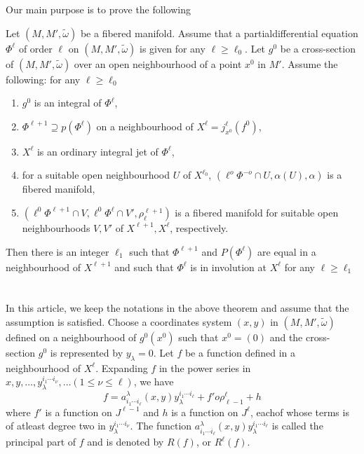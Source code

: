 Our main purpose is to prove the following

\begin{theorem}\label{chap3:sec3.16:thm6}%
  Let $(M,M', \tilde{\omega})$ be a fibered manifold. Assume that a
  partial\pageoriginale differential equation $\Phi^\ell$ of order $\ell$ on
  $(M,M',\tilde{\omega})$ is given for any $\ell \geq \ell_0$. Let
  $g^0$ be a cross-section of $(M,M',\tilde{\omega})$ over an open
  neighbourhood of a point $x^0$ in $M'$. Assume the following: for
  any $\ell \geq \ell_0$  
  \begin{enumerate}[\rm (i)]
  \item $g^0$ is an integral of $\Phi^\ell$,
  \item $\Phi^{\ell+1} \supseteq p (\Phi^\ell)$ on a neighbourhood of
    $X^\ell = j^{\ell}_{x^0} (f^0)$, 
  \item $X^\ell$ is an ordinary integral jet of $\Phi^\ell$,
  \item for a suitable open neighbourhood $U$ of $X^{\ell_0}$,
    $(\ell^o \Phi^{-o} \cap U, \alpha (U),\alpha)$ is a fibered manifold,
  \item $(\ell^0 \Phi ^{\ell+1} \cap V, \ell^0 \Phi ^\ell \cap V',
    \rho^{\ell+1}_{\ell})$ is a fibered manifold for suitable open
    neighbourhoods $V,V'$ of $X^{\ell+1},X^\ell$, respectively.  
  \end{enumerate}
\end{theorem}

Then there is an integer $\ell_1$ such that $\Phi^{\ell+1}$ and
$P(\Phi^\ell)$ are equal in a neighbourhood of $X^{\ell+1}$ and such
that $\Phi^\ell$ is in involution at $X^\ell$ for any $\ell\geq
\ell_1$  
 
\section{}\label{chap3:sec3.17}%

In this article, we keep the notations in the above theorem and assume
that the assumption is satisfied. Choose a coordinates system $(x,y)$
in $(M,M',\tilde{\omega})$ defined on a neighbourhood of $g^0(x^0)$
such that $x^0=(0)$ and the cross-section $g^0$ is represented by
$y_\lambda =0$. Let $f$ be a function defined in a neighbourhood of
$X^\ell$. Expanding $f$ in the power series in $x,y,\ldots ,y_\lambda
^{i_1\cdots i_\nu},\ldots (1 \leq \nu \leq \ell)$, we have  
$$
f = a^\lambda_{i_1\cdots i_\ell} (x,y)y_\lambda^{i_1\cdots i_\ell} +
f' o \rho^\ell_{\ell-1} + h 
$$
where $f'$ is a function on $J^{\ell-1}$ and $h$ is a function on
$J^\ell$, each\pageoriginale of whose terms is of atleast degree two in
$y^{i_1\cdots i_\nu}_{\lambda}$. The function $a^\lambda_{i_1\cdots
  i_\ell} (x,y) y^{i_1\cdots i_\ell}_\lambda$ is called the principal
part of $f$ and is denoted by $R(f)$, or $R^\ell(f)$.  
  
